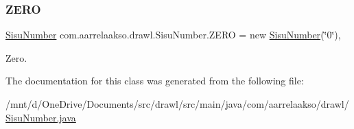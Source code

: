 \subsubsection{\texorpdfstring{Z\+E\+RO}{ZERO}}
{\footnotesize\ttfamily \hyperlink{classcom_1_1aarrelaakso_1_1drawl_1_1_sisu_number}{Sisu\+Number} com.\+aarrelaakso.\+drawl.\+Sisu\+Number.\+Z\+E\+RO = new \hyperlink{classcom_1_1aarrelaakso_1_1drawl_1_1_sisu_number}{Sisu\+Number}(\char`\"{}0\char`\"{})\hspace{0.3cm}{\ttfamily [static]}, {\ttfamily [protected]}}



Zero. 



The documentation for this class was generated from the following file\+:\begin{DoxyCompactItemize}
\item 
/mnt/d/\+One\+Drive/\+Documents/src/drawl/src/main/java/com/aarrelaakso/drawl/\hyperlink{_sisu_number_8java}{Sisu\+Number.\+java}\end{DoxyCompactItemize}
